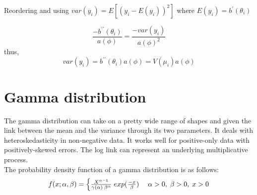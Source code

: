 Reordering and using $var(y_i)=E[(y_i-E(y_i))^2]$ 
where $E(y_i)=b^{\prime}(\theta_i)$

\begin{equation}
	\frac{-b^{\prime\prime}(\theta_i)}{a(\phi)}=\frac{-var(y_i)}{a(\phi)^2}
\end{equation}
thus,
\begin{equation}
	var(y_i)=b^{\prime\prime}(\theta_i)a(\phi)=V(\mu_i)a(\phi)
\end{equation}
\section*{Gamma distribution}
The gamma distribution can take on a pretty wide range of shapes and given the link between the mean and the variance through its two parameters. It deals with heteroskedasticity in non-negative data. It works well for positive-only data with positively-skewed errors. The log link can represent an underlying multiplicative process.\\
The probability density function of a gamma distribution
is as follows:
\begin{equation}
	\centering
	\label{eqn:GE}
	f(x;\alpha,\beta)=
	\begin{cases}
		{\frac{X^{\alpha-1}}{\gamma(\alpha)\;  \beta^\alpha} }\; exp(\frac{-x}{\beta}) &\; \alpha > 0 , \; \beta > 0 ,\; x > 0
	\end{cases}
\end{equation}	





